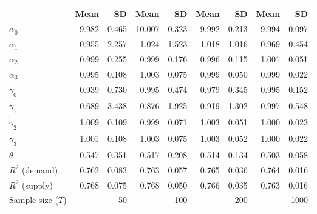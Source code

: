 
\begin{tabular}[t]{lrrrrrrrr}
\toprule
  & Mean & SD & Mean  & SD  & Mean   & SD   & Mean    & SD   \\
\midrule
$\alpha_{0}$ & 9.982 & 0.465 & 10.007 & 0.323 & 9.992 & 0.213 & 9.994 & 0.097\\
$\alpha_{1}$ & 0.955 & 2.257 & 1.024 & 1.523 & 1.018 & 1.016 & 0.969 & 0.454\\
$\alpha_{2}$ & 0.999 & 0.255 & 0.999 & 0.176 & 0.996 & 0.115 & 1.001 & 0.051\\
$\alpha_{3}$ & 0.995 & 0.108 & 1.003 & 0.075 & 0.999 & 0.050 & 0.999 & 0.022\\
$\gamma_{0}$ & 0.939 & 0.730 & 0.995 & 0.474 & 0.979 & 0.345 & 0.995 & 0.152\\
$\gamma_{1}$ & 0.689 & 3.438 & 0.876 & 1.925 & 0.919 & 1.302 & 0.997 & 0.548\\
$\gamma_{2}$ & 1.009 & 0.109 & 0.999 & 0.071 & 1.003 & 0.051 & 1.000 & 0.023\\
$\gamma_{3}$ & 1.001 & 0.108 & 1.003 & 0.075 & 1.003 & 0.052 & 1.000 & 0.022\\
$\theta$ & 0.547 & 0.351 & 0.517 & 0.208 & 0.514 & 0.134 & 0.503 & 0.058\\
$R^{2}$ (demand) & 0.762 & 0.083 & 0.763 & 0.057 & 0.765 & 0.036 & 0.764 & 0.016\\
$R^{2}$ (supply) & 0.768 & 0.075 & 0.768 & 0.050 & 0.766 & 0.035 & 0.763 & 0.016\\
Sample size ($T$) &  & 50 &  & 100 &  & 200 &  & 1000\\
\bottomrule
\end{tabular}
